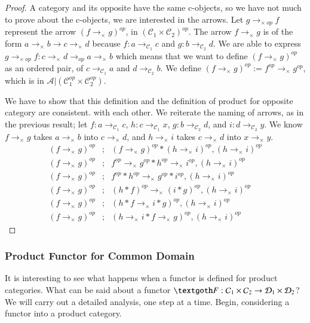 \documentclass [12pt]{book}
\begin{document}
\begin{proof}A category and its opposite have the same c-objects, so we have not much to prove about the c-objects, we are interested in the arrows. Let $g\rightarrow_{\times~op} f$ represent the arrow $(f\rightarrow_\times g)^{op}$, in $(\mathcal C_1\times\mathcal C_2)^{op}$. The arrow $f\rightarrow_\times g$ is of the form $a\rightarrow_\times b\longrightarrow c\rightarrow_\times d$ because $f:a\rightarrow_{\mathcal C_1} c$ and $g:b\rightarrow_{\mathcal C_2}d$. We are able to express $g\rightarrow_{\times~op} f:c\rightarrow_\times d\longrightarrow_{op} a\rightarrow_\times b$ which means that we want to define  $(f\rightarrow_\times g)^{op}$ as an ordered pair, of $c\rightarrow_{\mathcal C_1}a$ and $d\rightarrow_{\mathcal C_2}b$. We define $(f\rightarrow_\times g)^{op}:=f^{op}\rightarrow_\times g^{op}$, which is in $\mathcal A|(\mathcal C_1^{op}\times\mathcal C_2^{op})$.

We have to show that this definition and the definition of product for opposite category are consistent. with each other. We reiterate the naming of arrows, as in the previous result; let $f:a\rightarrow_{\mathcal C_1}c$, $h:c\rightarrow_{\mathcal C_1}x$, $g:b\rightarrow_{\mathcal C_2}d$, and $i:d\rightarrow_{\mathcal C_2}y$. We know $f\rightarrow_\times g$ takes $a\rightarrow_\times b$ into $c\rightarrow_\times d$, and $h\rightarrow_\times i$ takes $c\rightarrow_\times d$ into $x\rightarrow_\times y$.\begin{eqnarray}\nonumber(f\rightarrow_\times g)^{op}&;&(f\rightarrow_\times g)^{op}*(h\rightarrow_\times i)^{op},(h\rightarrow_\times i)^{op}\\\nonumber(f\rightarrow_\times g)^{op}&;&f^{op}\rightarrow_\times g^{op}*h^{op}\rightarrow_\times i^{op},(h\rightarrow_\times i)^{op}\\\nonumber(f\rightarrow_\times g)^{op}&;&f^{op}*h^{op}\rightarrow_\times g^{op}*i^{op},(h\rightarrow_\times i)^{op}\\\nonumber(f\rightarrow_\times g)^{op}&;&(h*f)^{op}\rightarrow_\times (i*g)^{op},(h\rightarrow_\times i)^{op}\\\nonumber(f\rightarrow_\times g)^{op}&;&(h*f\rightarrow_\times i*g)^{op},(h\rightarrow_\times i)^{op}\\\nonumber(f\rightarrow_\times g)^{op}&;&(h\rightarrow_\times i*f\rightarrow_\times g)^{op},(h\rightarrow_\times i)^{op}\end{eqnarray}\end{proof}

			\subsubsection{Product Functor for Common Domain}It is interesting to see what happens when a functor is defined for product categories. What can be said about a functor $\textgoth F:\mathcal C_1\times\mathcal C_2\rightarrow\mathcal D_1\times\mathcal D_2$? We will carry out a detailed analysis, one step at a time. Begin, considering a functor into a product category.
\end{document}
